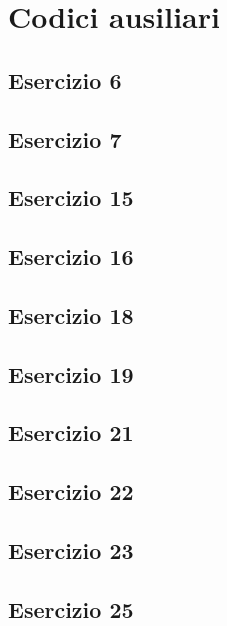 \section{Codici ausiliari}

\subsection{Esercizio 6}

 
\subsection{Esercizio 7}


\subsection{Esercizio 15}


\subsection{Esercizio 16}


\subsection{Esercizio 18}


\subsection{Esercizio 19}


\subsection{Esercizio 21}


\subsection{Esercizio 22}


\subsection{Esercizio 23}


\subsection{Esercizio 25}
